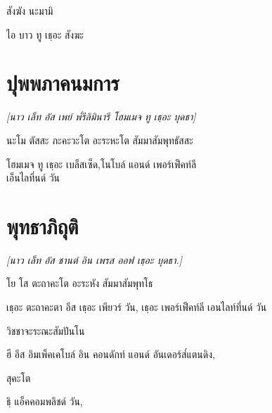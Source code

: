 {สังฆัง นะมามิ

\begin{english}
	ไอ บาว ทู เธฺอะ สังฆะ 
\end{english}

\chapter{ปุพพภาคนมการ}

\begin{leader}
\end{leader}

\begin{leader}
\textit{[นาว เล็ท อัส เพย์ พ๎รีลิมินารี โฮมเมจ ทู เธฺอะ บุดธา]}
\end{leader}

นะโม ตัสสะ ภะคะวะโต อะระหะโต สัมมาสัมพุทธัสสะ

\begin{english}
โฮมเมจ ทู เธฺอะ เบล็สเซ็ด,โนโบล์ แอนด์ เพอร์เฟ็คท์ลี\\
\vin เอ็นไลทึ่นด์ วัน
\end{english}

\chapter{พุทธาภิถุติ}

\begin{leader}
\end{leader}

\begin{leader}
\textit{[นาว เล็ท อัส ชานต์ อิน เพรส ออฟ เธฺอะ บุดธา.]}
\end{leader}

โย โส ตะถาคะโต อะระหัง สัมมาสัมพุทโธ

\begin{english}
เธฺอะ ตะถาคะตา อีส เธฺอะ เพียวร์ วัน, เธฺอะ เพอร์เฟ็คท์ลี เอนไลท์ทึ่นด์ วัน
\end{english}

วิชชาจะระณะสัมปันโน

\begin{english}
ฮี อีส อิมเพ็คเคโบล์ อิน คอนดักท์ แอนด์ อันเดอร์ส๎แตนดิง,
\end{english}

สุคะโต

\begin{english}
ธิฺ แอ็คคอมพลิชด์ วัน,
\end{english}

}
